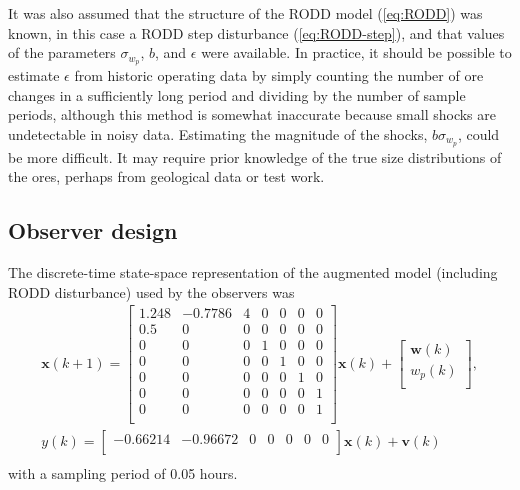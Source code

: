 It was also assumed that the structure of the RODD model (\ref{eq:RODD}) was known, in this case a RODD step disturbance (\ref{eq:RODD-step}), and that values of the parameters $\sigma_{w_p}$, $b$, and $\epsilon$ were available. In practice, it should be possible to estimate $\epsilon$ from historic operating data by simply counting the number of ore changes in a sufficiently long period and dividing by the number of sample periods, although this method is somewhat inaccurate because small shocks are undetectable in noisy data. Estimating the magnitude of the shocks, $b$$\sigma_{w_p}$, could be more difficult. It may require prior knowledge of the true size distributions of the ores, perhaps from geological data or test work.

\subsection{Observer design} \label{sec:grind1-obs-design}

The discrete-time state-space representation of the augmented model (including RODD disturbance) used by the observers was
\begin{multline} \label{eq:grind1-obs_ss_model}
	\mathbf{x}(k+1) = 
	\begin{bmatrix}
		1.248 & -0.7786 & 4 & 0 & 0 & 0 & 0 \\
		0.5   &  0      & 0 & 0 & 0 & 0 & 0 \\
		0     &  0      & 0 & 1 & 0 & 0 & 0 \\
		0     &  0      & 0 & 0 & 1 & 0 & 0 \\
		0     &  0      & 0 & 0 & 0 & 1 & 0 \\
		0     &  0      & 0 & 0 & 0 & 0 & 1 \\
		0     &  0      & 0 & 0 & 0 & 0 & 1 \\
	\end{bmatrix} \mathbf{x}(k)
	+ \begin{bmatrix}
		\mathbf{w}(k) \\
		w_p(k) \\
	\end{bmatrix}, \\
	y(k) = 
	\begin{bmatrix}
		-0.66214 & -0.96672 & 0 & 0 & 0 & 0 & 0 \\
	\end{bmatrix} \mathbf{x}(k) + \mathbf{v}(k) \\
\end{multline}
with a sampling period of 0.05 hours.

